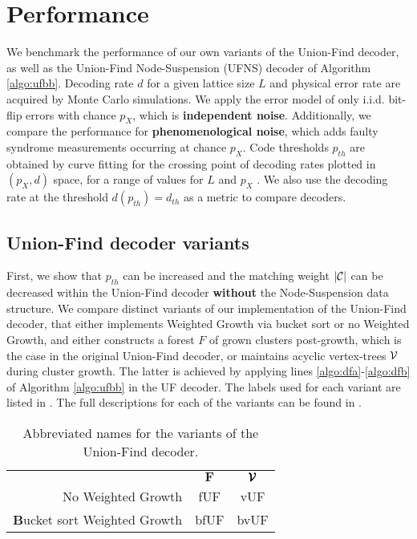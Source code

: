 \section{Performance}\label{sec:performance}

We benchmark the performance of our own variants of the Union-Find decoder, as well as the Union-Find Node-Suspension (UFNS) decoder of Algorithm \ref{algo:ufbb}. Decoding rate $d$ for a given lattice size $L$ and physical error rate are acquired by Monte Carlo simulations. We apply the error model of only i.i.d. bit-flip errors with chance $p_X$, which is \textbf{independent noise}. Additionally, we compare the performance for \textbf{phenomenological noise}, which adds faulty syndrome measurements occurring at chance $p_X$. Code thresholds $p_{th}$ are obtained by curve fitting for the crossing point of decoding rates plotted in $(p_X, d)$ space, for a range of values for $L$ and $p_X$ \cite{wang2003confinement}. We also use the decoding rate at the threshold $d(p_{th})= d_{th}$ as a metric to compare decoders. 

\subsection{Union-Find decoder variants}

First, we show that $p_{th}$ can be increased and the matching weight $\lvert\mathcal{C}\rvert$ can be decreased within the Union-Find decoder \textbf{without} the Node-Suspension data structure. We compare distinct variants of our implementation of the Union-Find decoder, that either implements Weighted Growth via bucket sort or no Weighted Growth, and either constructs a forest $F$ of grown clusters post-growth, which is the case in the original Union-Find decoder, or maintains acyclic vertex-trees $\mathcal{V}$ during cluster growth. The latter is achieved by applying lines \ref{algo:dfa}-\ref{algo:dfb} of Algorithm \ref{algo:ufbb} in the UF decoder. The labels used for each variant are listed in . The full descriptions for each of the variants can be found in \cite{markthesis}.

\begin{table}[htbp]
  \centering
  \begin{tabularx}{\linewidth} { | R{2} || C{.5} | C{.5} | }
    \hline
    & $\mathbf{F}$ &  $\pmb{\mathcal{V}}$\\
    \hhline{|=::=:=|}
    No Weighted Growth & fUF  & vUF \\
    \hline
    \textbf{B}ucket sort Weighted Growth & bfUF & bvUF \\
    \hline
  \end{tabularx}
  \caption{Abbreviated names for the variants of the Union-Find decoder.}\label{tab:uftable}
\end{table}

